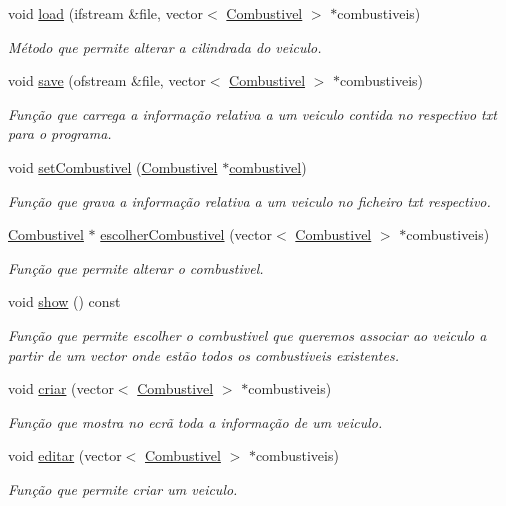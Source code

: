 \begin{DoxyCompactItemize}
void \hyperlink{class_veiculo_a1e72c5592016f150fec8fcede73eb536}{load} (ifstream \&file, vector$<$ \hyperlink{class_combustivel}{Combustivel} $>$ $\ast$combustiveis)
\begin{DoxyCompactList}\small\item\em Método que permite alterar a cilindrada do veiculo. \end{DoxyCompactList}\item 
void \hyperlink{class_veiculo_a9f7396b5b6ba78f18b16192e38f501df}{save} (ofstream \&file, vector$<$ \hyperlink{class_combustivel}{Combustivel} $>$ $\ast$combustiveis)
\begin{DoxyCompactList}\small\item\em Função que carrega a informação relativa a um veiculo contida no respectivo txt para o programa. \end{DoxyCompactList}\item 
void \hyperlink{class_veiculo_a885e49550f411dc99fa09ba226476679}{set\+Combustivel} (\hyperlink{class_combustivel}{Combustivel} $\ast$\hyperlink{class_veiculo_ad8416cc9da449baed5e07ed146572712}{combustivel})
\begin{DoxyCompactList}\small\item\em Função que grava a informação relativa a um veiculo no ficheiro txt respectivo. \end{DoxyCompactList}\item 
\hyperlink{class_combustivel}{Combustivel} $\ast$ \hyperlink{class_veiculo_a1f712b4c2a5b88c9d7fc6b0c35bd1547}{escolher\+Combustivel} (vector$<$ \hyperlink{class_combustivel}{Combustivel} $>$ $\ast$combustiveis)
\begin{DoxyCompactList}\small\item\em Função que permite alterar o combustivel. \end{DoxyCompactList}\item 
void \hyperlink{class_veiculo_ada18ff760e31a0ff31893eab3ac707ea}{show} () const 
\begin{DoxyCompactList}\small\item\em Função que permite escolher o combustivel que queremos associar ao veiculo a partir de um vector onde estão todos os combustiveis existentes. \end{DoxyCompactList}\item 
void \hyperlink{class_veiculo_a74d91260effb553fecdfdab126336d06}{criar} (vector$<$ \hyperlink{class_combustivel}{Combustivel} $>$ $\ast$combustiveis)
\begin{DoxyCompactList}\small\item\em Função que mostra no ecrã toda a informação de um veiculo. \end{DoxyCompactList}\item 
void \hyperlink{class_veiculo_af5d45a28c046917dda3ccfbfd3603825}{editar} (vector$<$ \hyperlink{class_combustivel}{Combustivel} $>$ $\ast$combustiveis)
\begin{DoxyCompactList}\small\item\em Função que permite criar um veiculo. \end{DoxyCompactList}\end{DoxyCompactItemize}
